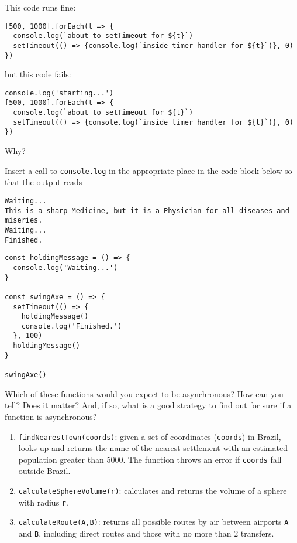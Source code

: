 
This code runs fine:

\begin{verbatim}
[500, 1000].forEach(t => {
  console.log(`about to setTimeout for ${t}`)
  setTimeout(() => {console.log(`inside timer handler for ${t}`)}, 0)
})
\end{verbatim}

\noindent
but this code fails:

\begin{verbatim}
console.log('starting...')
[500, 1000].forEach(t => {
  console.log(`about to setTimeout for ${t}`)
  setTimeout(() => {console.log(`inside timer handler for ${t}`)}, 0)
})
\end{verbatim}

\noindent
Why?


Insert a call to \texttt{console.log} in the appropriate place in the code block below
so that the output reads

\begin{verbatim}
Waiting...
This is a sharp Medicine, but it is a Physician for all diseases and miseries.
Waiting...
Finished.
\end{verbatim}

\begin{verbatim}
const holdingMessage = () => {
  console.log('Waiting...')
}

const swingAxe = () => {
  setTimeout(() => {
    holdingMessage()
    console.log('Finished.')
  }, 100)
  holdingMessage()
}

swingAxe()
\end{verbatim}


Which of these functions would you expect to be asynchronous?
How can you tell?
Does it matter?
And, if so, what is a good strategy to find out for sure if a function is asynchronous?

\begin{enumerate}
\item
  \texttt{findNearestTown(coords)}: given a set of coordinates (\texttt{coords}) in Brazil,
  looks up and returns the name of the nearest settlement with an estimated population greater than 5000.
  The function throws an error if \texttt{coords} fall outside Brazil.
\item
  \texttt{calculateSphereVolume(r)}: calculates and returns the volume of a sphere with radius \texttt{r}.
\item
  \texttt{calculateRoute(A,B)}: returns all possible routes by air between airports \texttt{A} and \texttt{B},
  including direct routes and those with no more than 2 transfers.
\end{enumerate}

